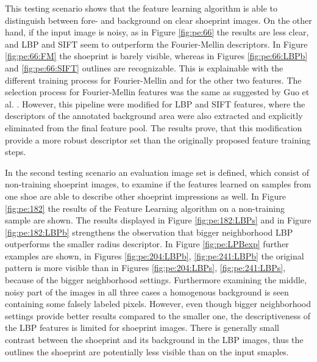 \documentclass[draft,final]{vutinfth} %
\begin{document}
\par
This testing scenario shows that the feature learning algorithm is able to distinguish between fore- and background on clear shoeprint images.
On the other hand, if the input image is noisy, as in Figure \ref{fig:pe:66} the results are less clear, and LBP and SIFT seem to outperform the Fourier-Mellin descriptors.
In Figure \ref{fig:pe:66:FM} the shoeprint is barely visible, whereas in Figures \ref{fig:pe:66:LBPb} and \ref{fig:pe:66:SIFT} outlines are recognizable.
This is explainable with the different training process for Fourier-Mellin and for the other two features.
The selection process for Fourier-Mellin features was the same as suggested by Guo et al. \cite{guo2012discriminative}.
However, this pipeline were modified for LBP and SIFT features, where the descriptors of the annotated background area were also extracted and explicitly eliminated from the final feature pool.
The results prove, that this modification provide a more robust descriptor set than the originally proposed feature training steps.
\par
In the second testing scenario an evaluation image set is defined, which consist of non-training shoeprint images, to examine if the features learned on samples from one shoe are able to describe other shoeprint impressions as well.
In Figure \ref{fig:pe:182} the results of the Feature Learning algorithm on a non-training sample are shown.
The results displayed in Figure \ref{fig:pe:182:LBPs} and in Figure \ref{fig:pe:182:LBPb} strengthens the observation that bigger neighborhood LBP outperforms the smaller radius descriptor.
In Figure \ref{fig:pe:LPBexp} further examples are shown, in Figures \ref{fig:pe:204:LBPb}, \ref{fig:pe:241:LBPb} the original pattern is more visible than in Figures \ref{fig:pe:204:LBPs}, \ref{fig:pe:241:LBPs}, because of the bigger neighborhood settings.
Furthermore examining the middle, noisy part of the images in all three cases a homogenous background is seen containing some falsely labeled pixels.
However, even though bigger neighborhood settings provide better results compared to the smaller one, the descriptiveness of the LBP features is limited for shoeprint images.
There is generally small contrast between the shoeprint and its background in the LBP images, thus the outlines the shoeprint are potentially less visible than on the input smaples.
\end{document}
